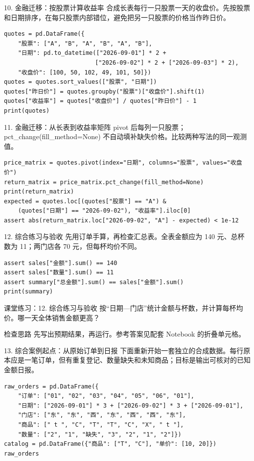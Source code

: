 \begin{frame}[fragile]{10. 金融迁移：按股票计算收益率}
\small 合成长表每行一只股票一天的收盘价。先按股票和日期排序，在每只股票内部错位，避免把另一只股票的价格当作昨日价。
\medskip
\begin{lstlisting}
quotes = pd.DataFrame({
    "股票": ["A", "B", "A", "B", "A", "B"],
    "日期": pd.to_datetime(["2026-09-01"] * 2 +
                          ["2026-09-02"] * 2 + ["2026-09-03"] * 2),
    "收盘价": [100, 50, 102, 49, 101, 50]})
quotes = quotes.sort_values(["股票", "日期"])
quotes["昨日价"] = quotes.groupby("股票")["收盘价"].shift(1)
quotes["收益率"] = quotes["收盘价"] / quotes["昨日价"] - 1
print(quotes)
\end{lstlisting}
\end{frame}

\begin{frame}[fragile]{11. 金融迁移：从长表到收益率矩阵}
\small pivot 后每列一只股票；pct\_change(fill\_method=None) 不自动填补缺失价格。比较两种写法的同一观测值。
\medskip
\begin{lstlisting}
price_matrix = quotes.pivot(index="日期", columns="股票", values="收盘价")
return_matrix = price_matrix.pct_change(fill_method=None)
print(return_matrix)
expected = quotes.loc[(quotes["股票"] == "A") &
    (quotes["日期"] == "2026-09-02"), "收益率"].iloc[0]
assert abs(return_matrix.loc["2026-09-02", "A"] - expected) < 1e-12
\end{lstlisting}
\end{frame}

\begin{frame}[fragile]{12. 综合练习与验收}
\small 先用订单手算，再检查汇总表。全表金额应为 140 元、总杯数为 11；两门店各 70 元，但每杯均价不同。
\medskip
\begin{lstlisting}
assert sales["金额"].sum() == 140
assert sales["数量"].sum() == 11
assert summary["总金额"].sum() == sales["金额"].sum()
print(summary)
\end{lstlisting}
\end{frame}
\begin{frame}[fragile]{课堂练习：12. 综合练习与验收}
按“日期—门店”统计金额与杯数，并计算每杯均价。哪一天全体销售金额更高？
\medskip
\begin{block}{检查思路}
先写出预期结果，再运行。参考答案见配套 Notebook 的折叠单元格。
\end{block}
\end{frame}

\begin{frame}[fragile]{13. 综合案例起点：从原始订单到日报}
\small 下面重新开始一套独立的合成数据。每行原本应是一笔订单，但有重复登记、数量缺失和未知商品；目标是输出可核对的已知金额日报。
\medskip
\begin{lstlisting}
raw_orders = pd.DataFrame({
    "订单": ["01", "02", "03", "04", "05", "06", "01"],
    "日期": ["2026-09-01"] * 3 + ["2026-09-02"] * 3 + ["2026-09-01"],
    "门店": ["东", "东", "西", "东", "西", "西", "东"],
    "商品": [" t ", "C", "T", "T", "C", "X", " t "],
    "数量": ["2", "1", "缺失", "3", "2", "1", "2"]})
catalog = pd.DataFrame({"商品": ["T", "C"], "单价": [10, 20]})
raw_orders
\end{lstlisting}
\end{frame}

